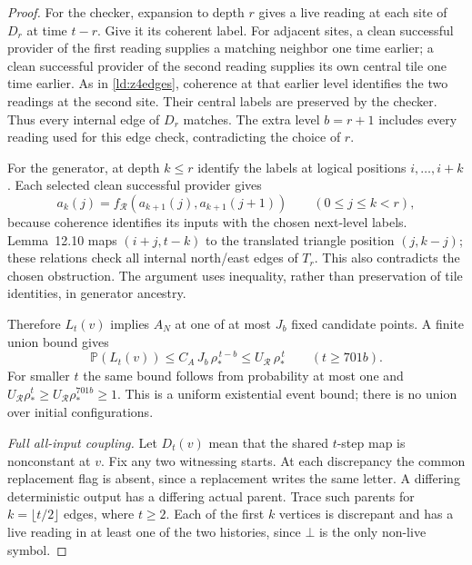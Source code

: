 \begin{proof}
For the checker, expansion to depth $r$ gives a live reading at each site of $D_r$ at time $t-r$. Give it its coherent label. For adjacent sites, a clean successful provider of the first reading supplies a matching neighbor one time earlier; a clean successful provider of the second reading supplies its own central tile one time earlier. As in \cref{ld:z4edges}, coherence at that earlier level identifies the two readings at the second site. Their central labels are preserved by the checker. Thus every internal edge of $D_r$ matches. The extra level $b=r+1$ includes every reading used for this edge check, contradicting the choice of $r$.

For the generator, at depth $k\le r$ identify the labels at logical positions $i,\ldots,i+k$. Each selected clean successful provider gives
\[
 a_k(j)=f_{\mathcal R}(a_{k+1}(j),a_{k+1}(j+1))
 \qquad(0\le j\le k<r),
\]
because coherence identifies its inputs with the chosen next-level labels. Lemma~12.10 maps $(i+j,t-k)$ to the translated triangle position $(j,k-j)$; these relations check all internal north/east edges of $T_r$. This also contradicts the chosen obstruction. The argument uses inequality, rather than preservation of tile identities, in generator ancestry.

Therefore $L_t(v)$ implies $A_N$ at one of at most $J_b$ fixed candidate points. A finite union bound
gives
\[
  \mathbb{P}(L_t(v))\le C_A\,J_b\,\rho_*^{\,t-b}\le U_{\mathcal R}\,\rho_*^{\,t}\qquad(t\ge701b).
\]
For smaller $t$ the same bound follows from probability at most one and $U_{\mathcal R}\rho_*^t\ge
U_{\mathcal R}\rho_*^{701b}\ge1$. This is a uniform existential event bound; there is no union over initial
configurations.

\emph{Full all-input coupling.}
Let $D_t(v)$ mean that the shared $t$-step map is nonconstant at $v$. Fix any two witnessing starts. At each discrepancy the common replacement flag is absent, since a replacement writes the same letter. A differing deterministic output has a differing actual parent. Trace such parents for $k=\lfloor t/2\rfloor$ edges, where $t\ge2$. Each of the first $k$ vertices is discrepant and has a live reading in at least one of the two histories, since $\bot$ is the only non-live symbol.


\end{proof}
